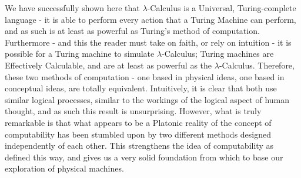 \documentclass[Master.tex]{subfiles}
\begin{document}
We have successfully shown here that $\lambda$-Calculus is a Universal, Turing-complete language - it is able to perform every action that a Turing Machine can perform, and as such is at least as powerful as Turing's method of computation. Furthermore - and this the reader must take on faith, or rely on intuition - it is possible for a Turing machine to simulate $\lambda$-Calculus; Turing machines are Effectively Calculable, and are at least as powerful as the $\lambda$-Calculus. Therefore, these two methods of computation - one based in physical ideas, one based in conceptual ideas, are totally equivalent. Intuitively, it is clear that both use similar logical processes, similar to the workings of the logical aspect of human thought, and as such this result is unsurprising. However, what is truly remarkable is that what appears to be a Platonic reality of the concept of computability has been stumbled upon by two different methods designed independently of each other. This strengthens the idea of computability as defined this way, and gives us a very solid foundation from which to base our exploration of physical machines.
\end{document}
